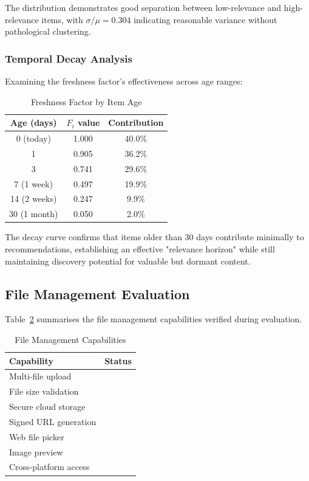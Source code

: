 \documentclass[10pt,twocolumn,a4paper]{article}
\newcommand{\cmark}{\ding{51}}
\begin{document}
The distribution demonstrates good separation between low-relevance and high-relevance items,
with $\sigma/\mu = 0.304$ indicating reasonable variance without pathological clustering.

\subsubsection{Temporal Decay Analysis}

Examining the freshness factor's effectiveness across age ranges:

\begin{table}[h]
\centering
\caption{Freshness Factor by Item Age}
\label{tab:decay}
\small
\begin{tabular}{|c|c|c|}
\hline
\textbf{Age (days)} & \textbf{$F_i$ value} & \textbf{Contribution} \\
\hline
0 (today)       & 1.000 & 40.0\% \\
1               & 0.905 & 36.2\% \\
3               & 0.741 & 29.6\% \\
7 (1 week)      & 0.497 & 19.9\% \\
14 (2 weeks)    & 0.247 & 9.9\% \\
30 (1 month)    & 0.050 & 2.0\% \\
\hline
\end{tabular}

\end{table}

\noindent The decay curve confirms that items older than 30 days contribute minimally to
recommendations, establishing an effective "relevance horizon" while still maintaining
discovery potential for valuable but dormant content.

\subsection{File Management Evaluation}

Table~\ref{tab:fileeval} summarises the file management capabilities verified during
evaluation.

\begin{table}[h]
\centering
\caption{File Management Capabilities}
\label{tab:fileeval}
\small
\begin{tabular}{|l|c|}
\hline
\textbf{Capability}        & \textbf{Status} \\
\hline
Multi-file upload          & \cmark \\
File size validation       & \cmark \\
Secure cloud storage       & \cmark \\
Signed URL generation      & \cmark \\
Web file picker            & \cmark \\
Image preview              & \cmark \\
Cross-platform access      & \cmark \\
\hline
\end{tabular}
\end{table}
\end{document}
